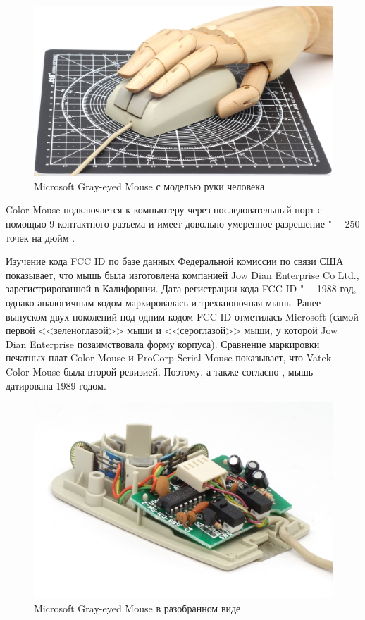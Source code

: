 \documentclass[11pt, a4paper]{article}
\begin{document}
\begin{figure}[h]
    \centering
    \includegraphics[scale=0.4]{1989_vatek_color_mouse/hand_30.jpg}
    \caption{Microsoft Gray-eyed Mouse с моделью руки человека}
    \label{fig:VatekColorHand}
\end{figure}

Color-Mouse подключается к компьютеру через последовательный порт с помощью 9-контактного разъема и имеет довольно умеренное разрешение "--- 250 точек на дюйм \cite{dpi}.

Изучение кода FCC ID по базе данных Федеральной комиссии по связи США показывает, что мышь была изготовлена компанией Jow Dian Enterprise Co Ltd., зарегистрированной в Калифорнии. Дата регистрации кода FCC ID "--- 1988 год, однако аналогичным кодом маркировалась и трехкнопочная мышь. Ранее выпуском двух поколений под одним кодом FCC ID отметилась Microsoft (самой первой <<зеленоглазой>> мыши и <<сероглазой>> мыши, у которой Jow Dian Enterprise позаимствовала форму корпуса). Сравнение маркировки печатных плат Color-Mouse и ProCorp Serial Mouse показывает, что Vatek Color-Mouse была второй ревизией. Поэтому, а также согласно \cite{mouses}, мышь датирована 1989 годом.

\begin{figure}[h]
    \centering
    \includegraphics[scale=0.8]{1989_vatek_color_mouse/inside_60.jpg}
    \caption{Microsoft Gray-eyed Mouse в разобранном виде}
    \label{fig:VatekColorInside}
\end{figure}
\end{document}
